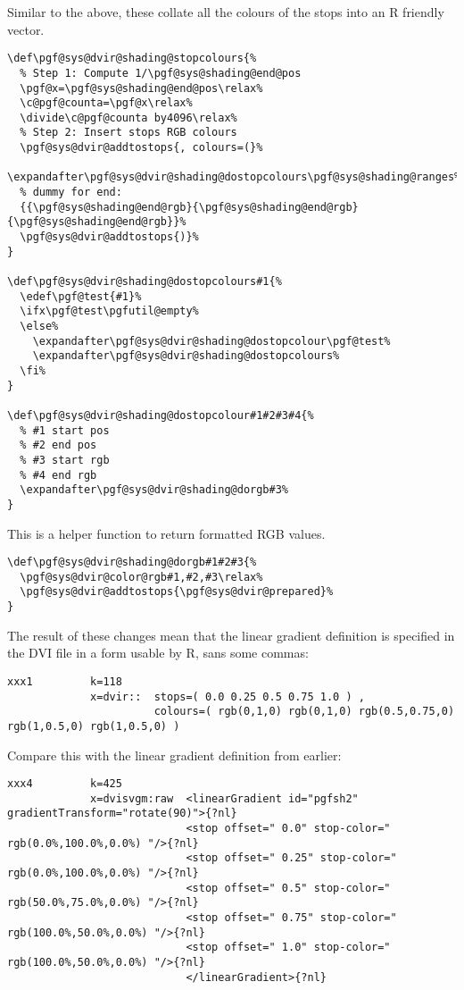 \documentclass[]{article}
\begin{document}
Similar to the above, these collate all the colours of the stops into an
R friendly vector.

\begin{verbatim}
\def\pgf@sys@dvir@shading@stopcolours{%
  % Step 1: Compute 1/\pgf@sys@shading@end@pos
  \pgf@x=\pgf@sys@shading@end@pos\relax%
  \c@pgf@counta=\pgf@x\relax%
  \divide\c@pgf@counta by4096\relax%
  % Step 2: Insert stops RGB colours
  \pgf@sys@dvir@addtostops{, colours=(}%
  \expandafter\pgf@sys@dvir@shading@dostopcolours\pgf@sys@shading@ranges%
  % dummy for end:
  {{\pgf@sys@shading@end@rgb}{\pgf@sys@shading@end@rgb}{\pgf@sys@shading@end@rgb}}%
  \pgf@sys@dvir@addtostops{)}%
}

\def\pgf@sys@dvir@shading@dostopcolours#1{%
  \edef\pgf@test{#1}%
  \ifx\pgf@test\pgfutil@empty%
  \else%
    \expandafter\pgf@sys@dvir@shading@dostopcolour\pgf@test%
    \expandafter\pgf@sys@dvir@shading@dostopcolours%
  \fi%
}

\def\pgf@sys@dvir@shading@dostopcolour#1#2#3#4{%
  % #1 start pos
  % #2 end pos
  % #3 start rgb
  % #4 end rgb
  \expandafter\pgf@sys@dvir@shading@dorgb#3%
}
\end{verbatim}

This is a helper function to return formatted RGB values.

\begin{verbatim}
\def\pgf@sys@dvir@shading@dorgb#1#2#3{%
  \pgf@sys@dvir@color@rgb#1,#2,#3\relax%
  \pgf@sys@dvir@addtostops{\pgf@sys@dvir@prepared}%
}
\end{verbatim}

The result of these changes mean that the linear gradient definition is
specified in the DVI file in a form usable by R, sans some commas:

\begin{verbatim}
xxx1         k=118
             x=dvir::  stops=( 0.0 0.25 0.5 0.75 1.0 ) , 
                       colours=( rgb(0,1,0) rgb(0,1,0) rgb(0.5,0.75,0) rgb(1,0.5,0) rgb(1,0.5,0) )
\end{verbatim}

Compare this with the linear gradient definition from earlier:

\begin{verbatim}
xxx4         k=425
             x=dvisvgm:raw  <linearGradient id="pgfsh2" gradientTransform="rotate(90)">{?nl} 
                            <stop offset=" 0.0" stop-color=" rgb(0.0%,100.0%,0.0%) "/>{?nl} 
                            <stop offset=" 0.25" stop-color=" rgb(0.0%,100.0%,0.0%) "/>{?nl} 
                            <stop offset=" 0.5" stop-color=" rgb(50.0%,75.0%,0.0%) "/>{?nl} 
                            <stop offset=" 0.75" stop-color=" rgb(100.0%,50.0%,0.0%) "/>{?nl} 
                            <stop offset=" 1.0" stop-color=" rgb(100.0%,50.0%,0.0%) "/>{?nl} 
                            </linearGradient>{?nl} 
\end{verbatim}
\end{document}
